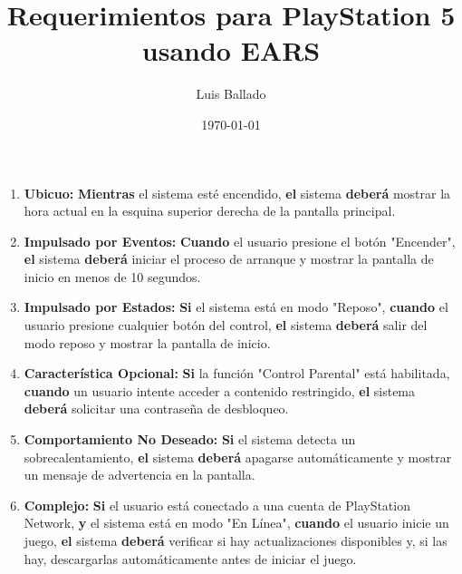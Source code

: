 \documentclass{article}
\title{Requerimientos para PlayStation 5 usando EARS}
\author{Luis Ballado}
\date{\today}
\begin{document}
\maketitle

\begin{enumerate}
    \item \textbf{Ubicuo:} 
    \textbf{Mientras} el sistema esté encendido, \textbf{el} sistema \textbf{deberá} mostrar la hora actual en la esquina superior derecha de la pantalla principal.

    \item \textbf{Impulsado por Eventos:} 
    \textbf{Cuando} el usuario presione el botón "Encender", \textbf{el} sistema \textbf{deberá} iniciar el proceso de arranque y mostrar la pantalla de inicio en menos de 10 segundos.

    \item \textbf{Impulsado por Estados:} 
    \textbf{Si} el sistema está en modo "Reposo", \textbf{cuando} el usuario presione cualquier botón del control, \textbf{el} sistema \textbf{deberá} salir del modo reposo y mostrar la pantalla de inicio.

    \item \textbf{Característica Opcional:} 
    \textbf{Si} la función "Control Parental" está habilitada, \textbf{cuando} un usuario intente acceder a contenido restringido, \textbf{el} sistema \textbf{deberá} solicitar una contraseña de desbloqueo.

    \item \textbf{Comportamiento No Deseado:} 
    \textbf{Si} el sistema detecta un sobrecalentamiento, \textbf{el} sistema \textbf{deberá} apagarse automáticamente y mostrar un mensaje de advertencia en la pantalla.

    \item \textbf{Complejo:} 
    \textbf{Si} el usuario está conectado a una cuenta de PlayStation Network, \textbf{y} el sistema está en modo "En Línea", \textbf{cuando} el usuario inicie un juego, \textbf{el} sistema \textbf{deberá} verificar si hay actualizaciones disponibles y, si las hay, descargarlas automáticamente antes de iniciar el juego.
\end{enumerate}
\end{document}
